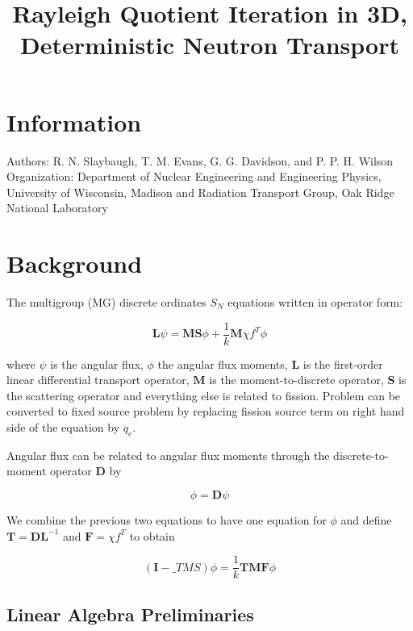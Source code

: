 \documentclass{article}
\title{Rayleigh Quotient Iteration in 3D, Deterministic Neutron Transport}
\date{\vspace{-5ex}}
\begin{document}
\maketitle

\section*{Information}

Authors: R. N. Slaybaugh, T. M. Evans, G. G. Davidson, and P. P. H. Wilson \\

Organization: Department of Nuclear Engineering and Engineering Physics, University of Wisconsin, Madison and Radiation Transport Group, Oak Ridge National Laboratory

\section*{Background}

The multigroup (MG) discrete ordinates $S_N$ equations written in operator form:

\begin{equation*}
\mathbf{L} \psi = \mathbf{MS} \phi + \frac{1}{k}\mathbf{M} \chi f^{T} \phi
\end{equation*}

where $\psi$ is the angular flux, $\phi$ the angular flux moments, $\mathbf{L}$ is the first-order linear differential transport operator, $\mathbf{M}$ is the moment-to-discrete operator, $\mathbf{S}$ is the scattering operator and everything else is related to fission. Problem can be converted to fixed source problem by replacing fission source term on right hand side of the equation by $q_e$.

Angular flux can be related to angular flux moments through the discrete-to-moment operator $\mathbf{D}$ by

\begin{equation*}
\phi = \mathbf{D} \psi
\end{equation*}

We combine the previous two equations to have one equation for $\phi$ and define $\mathbf{T} = \mathbf{DL}^{-1}$ and $\mathbf{F} = \chi f^{T}$ to obtain

\begin{equation*}
(\mathbf{I} - \mathbf_{TMS}) \phi = \frac{1}{k}\mathbf{TMF}\phi
\end{equation*}

\subsection*{Linear Algebra Preliminaries}
\end{document}
